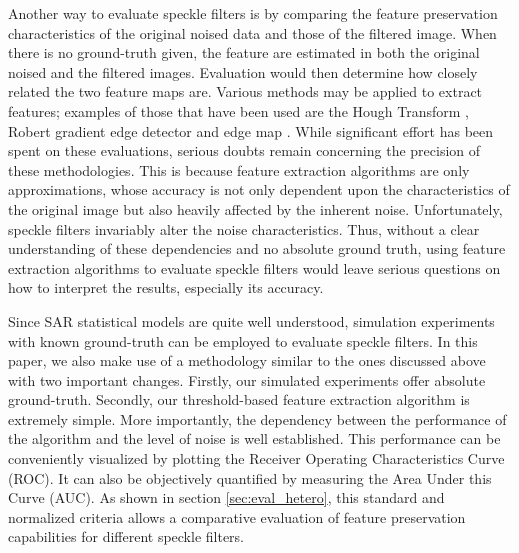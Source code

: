Another way to evaluate speckle filters is by comparing the feature preservation characteristics 
of the original noised data and those of the filtered image. 
When there is no ground-truth given, the feature are estimated in both the original noised and the filtered images.
Evaluation would then determine how closely related the two feature maps are. 
Various methods may be applied to extract features; examples of those that have been used are the 
	Hough Transform \cite{Medeiros_2003_IJRS}, Robert gradient edge detector \cite{Gagnon_SPIEProc_1997} 
	and edge map \cite{Frost_PAMI_1982}.
While significant effort has been spent on these evaluations, serious doubts remain concerning the precision 
of these methodologies.
This is because feature extraction algorithms are only approximations,
	whose accuracy is not only dependent upon the characteristics of the original image 
		but also heavily affected by 
		the inherent noise.
Unfortunately, speckle filters invariably alter the noise characteristics.
Thus, without a clear understanding of these dependencies and no absolute ground truth, 
	using feature extraction algorithms to evaluate speckle filters would leave serious questions on 
	how to interpret the results, especially its accuracy.

Since SAR statistical models are quite well understood, 
	simulation experiments with known ground-truth can be employed 
		to evaluate speckle filters.
In this paper, we also make use of a methodology similar to the ones discussed above with two important changes.
Firstly, our simulated experiments offer absolute ground-truth.
Secondly, our threshold-based feature extraction algorithm is extremely simple.
More importantly, the dependency between the performance of the algorithm and the level of noise is well established. 
This performance can be 
	conveniently visualized by plotting the Receiver Operating Characteristics Curve (ROC).   
It can also be objectively quantified by measuring the Area Under this Curve (AUC). 
As shown in section \ref{sec:eval_hetero}, this standard and normalized criteria allows a comparative evaluation of 
	feature preservation capabilities for different speckle filters.

